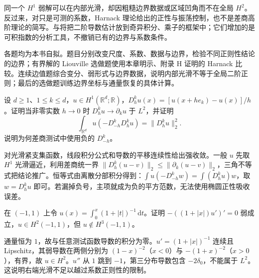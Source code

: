 同一个 \(H^1\) 弱解可以在内部光滑，却因粗糙边界数据或区域凹角而不在全局 \(H^2\)。反过来，对只是可测的系数，Harnack 理论给出的正性与振荡控制，也不是差商高阶理论的简写。与将把二阶导数估计放到奇异积分、乘子的框架中；它们增加的是可积指数的分析工具，不撤销已有的边界与系数条件。


\BookExercises

各题均为本书自拟。题目分别改变尺度、系数、数据与边界，检验不同正则性结论的边界；有界解的 Liouville 选做题使用本章明示、附录 H 证明的 Harnack 比较。连续边值题综合变分、弱形式与边界数据，说明内部光滑不等于全局二阶正则；最后的选做题训练边界坐标与通量恢复的具体计算。

\begin{exercise}\label{b2:ex:16-discrete-energy}
设 \(d\ge1\)、\(1\le k\le d\)，\(u\in H^1(\mathbb R^d;\mathbb R)\)，\(D_h^ku(x)=[u(x+he_k)-u(x)]/h\)。证明当非零实数 \(h\to0\) 时 \(D_h^ku\to\partial_ku\) 于 \(L^2\)，并证明
\[\int_{\mathbb R^d}u(-D_{-h}^kD_h^ku)=\lVert D_h^ku\rVert_2^2.\]
说明为何差商测试中使用负的 \(D_{-h}^k\)。
\end{exercise}
\begin{solution}
对光滑紧支集函数，线段积分公式和导数的平移连续性给出强收敛。一般 \(u\) 先取 \(H^1\) 光滑逼近，利用差商统一界 \(\lVert D_h^k(u-v)\rVert_2\le\lVert\partial_k(u-v)\rVert_2\)，三角不等式把结论推广。恒等式由离散分部积分得到：\(\int u(-D_{-h}^kw)=\int(D_h^ku)w\)，取 \(w=D_h^ku\) 即可。若漏掉负号，主项就成为负的平方范数，无法使用椭圆正性吸收误差。
\end{solution}

\begin{exercise}\label{b2:ex:16-lipschitz-not-h3}
在 \((-1,1)\) 上令 \(u(x)=\int_0^x(1+|t|)^{-1}\,\mathrm dt\)。证明 \(-((1+|x|)u')'=0\) 弱成立，\(u\in H^2(-1,1)\)，但 \(u\notin H^3(-1,1)\)。
\end{exercise}
\begin{solution}
通量恒为 \(1\)，故与任意测试函数导数的积分为零。\(u'=(1+|x|)^{-1}\) 连续且 Lipschitz，其弱导数在两侧分别为 \((1-x)^{-2}\)（\(x<0\)）与 \(-(1+x)^{-2}\)（\(x>0\)），有界，故 \(u\in H^2\)。\(u''\) 从 \(1\) 跳到 \(-1\)，第三分布导数包含 \(-2\delta_0\)，不能属于 \(L^2\)。这说明右端光滑不足以越过系数正则性的限制。
\end{solution}

